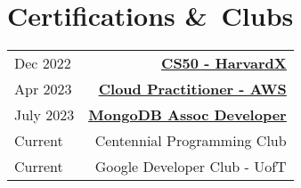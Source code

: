 
\section{Certifications \&\ Clubs}
\begin{tabular}{lr}
  Dec 2022  & \textbf{\underline{\href{https://certificates.cs50.io/5c64e9de-6da5-43d2-8e2d-f888535489b7.pdf?size=letter}{CS50 - HarvardX}}}             \\
  Apr 2023  & \textbf{\underline{\href{https://www.credly.com/badges/94d2934f-5383-4e1c-a55e-47515c806f7f/linked_in_profile}{Cloud Practitioner - AWS}}} \\
  July 2023 & \textbf{\underline{\href{https://www.credly.com/badges/21d50060-794b-4d25-b926-20b19de12ebe/linked_in_profile}{MongoDB Assoc Developer}}}  \\
  Current   & Centennial Programming Club                                                                                                                \\
  Current   & Google Developer Club - UofT
\end{tabular}
\sectionsep
